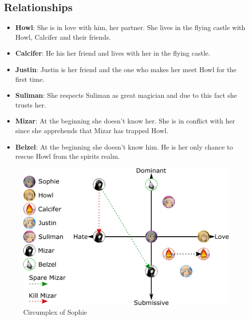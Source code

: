 \subsection{Relationships}
\begin{itemize}
\item \textbf{Howl}: She is in love with him, her partner. She lives in the flying castle with Howl, Calcifer and their friends.
\item \textbf{Calcifer}: He his her friend and lives with her in the flying castle.
\item \textbf{Justin}: Justin is her friend and the one who makes her meet Howl for the first time.
\item \textbf{Suliman}: She respects Suliman as great magician and due to this fact she trusts her.
\item \textbf{Mizar}: At the beginning she doesn’t know her. She is in conflict with her since she apprehends that Mizar has trapped Howl.
\item \textbf{Belzel}: At the beginning she doesn’t know him. He is her only chance to rescue Howl from the spirits realm.
\end{itemize}

\begin{figure}[H]
  \centering
  \includegraphics[width=14cm]{Images/Diagrams/Circumplexes/sophieCircumplex}
  \caption{Circumplex of Sophie}
\end{figure}

